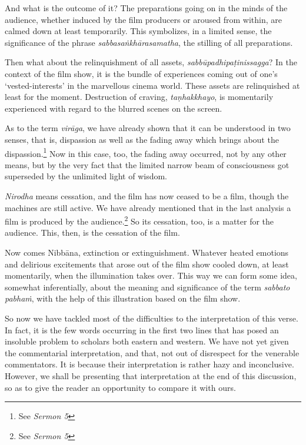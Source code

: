 And what is the outcome of it? The preparations going on in the minds of the audience, whether induced by the film producers or aroused from within, are calmed down at least temporarily. This symbolizes, in a limited sense, the significance of the phrase \emph{sabbasaṅkhārasamatha}, the stilling of all preparations.

Then what about the relinquishment of all assets, \emph{sabbūpadhipaṭinissagga}? In the context of the film show, it is the bundle of experiences coming out of one's `vested-interests' in the marvellous cinema world. These assets are relinquished at least for the moment. Destruction of craving, \emph{taṇhakkhayo}, is momentarily experienced with regard to the blurred scenes on the screen.

As to the term \emph{virāga}, we have already shown that it can be understood in two senses, that is, dispassion as well as the fading away which brings about the dispassion.\footnote{See \emph{Sermon 5}} Now in this case, too, the fading away occurred, not by any other means, but by the very fact that the limited narrow beam of consciousness got superseded by the unlimited light of wisdom.

\emph{Nirodha} means cessation, and the film has now ceased to be a film, though the machines are still active. We have already mentioned that in the last analysis a film is produced by the audience.\footnote{See \emph{Sermon 5}} So its cessation, too, is a matter for the audience. This, then, is the cessation of the film.

Now comes Nibbāna, extinction or extinguishment. Whatever heated emotions and delirious excitements that arose out of the film show cooled down, at least momentarily, when the illumination takes over. This way we can form some idea, somewhat inferentially, about the meaning and significance of the term \emph{sabbato pabhaṁ}, with the help of this illustration based on the film show.

So now we have tackled most of the difficulties to the interpretation of this verse. In fact, it is the few words occurring in the first two lines that has posed an insoluble problem to scholars both eastern and western. We have not yet given the commentarial interpretation, and that, not out of disrespect for the venerable commentators. It is because their interpretation is rather hazy and inconclusive. However, we shall be presenting that interpretation at the end of this discussion, so as to give the reader an opportunity to compare it with ours.

